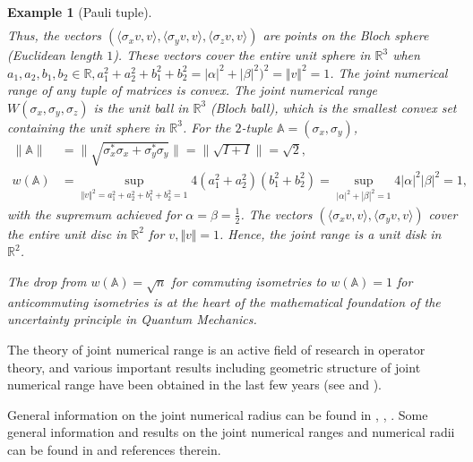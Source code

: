 \documentclass[12pt]{article}
\newtheorem{example}{Example}
\begin{document}
\begin{example}[Pauli tuple]
\begin{align*}
\end{align*}
Thus, the vectors $(\langle \sigma_x v, v\rangle, \langle \sigma_y v, v\rangle, \langle \sigma_z v, v\rangle)$ are points on the Bloch sphere (Euclidean length $1$).
These vectors cover the entire unit sphere in $\mathbb{R}^3$ when $a_1, a_2, b_1, b_2 \in \mathbb{R}, a_1^2 + a_2^2 + b_1^2 + b_2^2=|\alpha|^2+|\beta|^2)^2 = \Vert v \Vert^2= 1$.
The joint numerical range of any tuple of matrices is convex. The joint numerical range $W(\sigma_x, \sigma_y, \sigma_z)$ is the unit ball in $\mathbb{R}^3$ (Bloch ball), which is
the smallest convex set containing the unit sphere in $\mathbb{R}^3$.
For the $2$-tuple $\mathbb{A}=(\sigma_x, \sigma_y)$,
\begin{align*}
\|\mathbb{A}\| & = \|\sqrt{\sigma_x^*\sigma_x+\sigma_y^*\sigma_y}\|=\|\sqrt{I+I}\| = \sqrt{2},\\
w(\mathbb{A})& = \sup\limits_{\Vert v \Vert^2= a_1^2+a_2^2+b_1^2+b_2^2=1} 4 (a_1^2+a_2^2) (b_1^2+b_2^2)
=\sup\limits_{|\alpha|^2+|\beta|^2=1} 4|\alpha|^2  |\beta|^2 =1,
\end{align*}
with the supremum achieved for $\alpha=\beta=\frac{1}{2}$. The vectors $(\langle \sigma_x v, v \rangle,\langle \sigma_y v, v \rangle)$ cover the entire unit disc in $\mathbb{R}^2$ for $v, \Vert v \Vert= 1$.
Hence, the joint range is a unit disk in $\mathbb{R}^2$.

The drop from \(w(\mathbb{A}) = \sqrt{n}\)  for commuting isometries to \(w(\mathbb{A}) = 1\) for anticommuting isometries
is at the heart of the mathematical foundation of the uncertainty principle in Quantum Mechanics.
\end{example}

The theory of joint numerical range is an active field of research in operator theory,
and various important results including geometric structure of joint numerical range
have been obtained in the last few years (see \cite{Drnovsek2014} and \cite{Muller2014}).

General information on the joint numerical radius can be found in \cite{Bhunia2022}, \cite{Dragomir2013}, \cite{Gau2021}. Some general information and results on the joint numerical ranges and numerical radii can be
found in \cite{Feki2024, Gau2021, Guesba2024, Guesba2025, Mal2023, Muller2020, Wang2025} and references therein.
\end{document}
